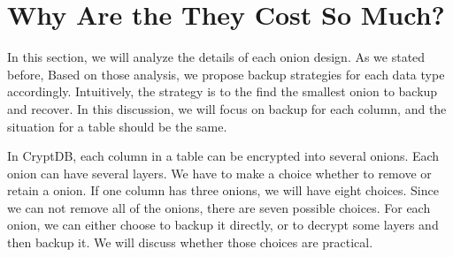 \section{Why Are the They Cost So Much?}

In this section, we will analyze the details of each onion design. As we stated before, Based on those analysis, we propose backup strategies for each data type accordingly. Intuitively, the strategy is to the find the smallest onion to backup and recover. In this discussion, we will focus on backup for each column, and the situation for a table should be the same. 

In CryptDB, each column in a table can be encrypted into several onions. Each onion can have several layers. We have to make a choice whether to remove or retain a onion. If one column has three onions, we will have eight choices. Since we can not remove all of the onions, there are seven possible choices. For each onion, we can either choose to backup it directly, or to decrypt some layers and then backup it. We will discuss whether those choices are practical.







